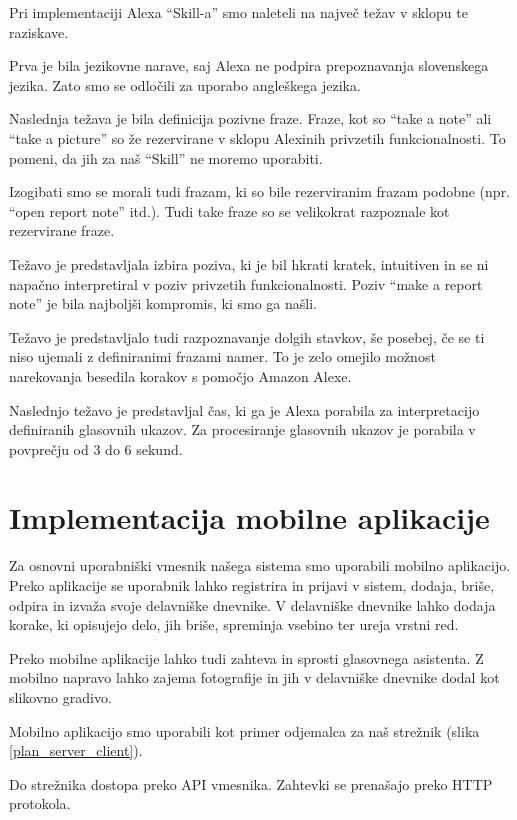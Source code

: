 \documentclass[a4paper, 12pt]{book}
\begin{document}
Pri implementaciji Alexa \enquote{Skill-a} smo naleteli na največ težav v sklopu te raziskave.

Prva je bila jezikovne narave, saj Alexa ne podpira prepoznavanja slovenskega jezika.
Zato smo se odločili za uporabo angleškega jezika.

Naslednja težava je bila definicija pozivne fraze.
Fraze, kot so \enquote{take a note} ali \enquote{take a picture} so že rezervirane v sklopu Alexinih privzetih funkcionalnosti.
To pomeni, da jih za naš \enquote{Skill} ne moremo uporabiti.

Izogibati smo se morali tudi frazam, ki so bile rezerviranim frazam podobne (npr. \enquote{open report note} itd.).
Tudi take fraze so se velikokrat razpoznale kot rezervirane fraze.

Težavo je predstavljala izbira poziva, ki je bil hkrati kratek, intuitiven in se ni napačno interpretiral v poziv privzetih funkcionalnosti.
Poziv \enquote{make a report note} je bila najboljši kompromis, ki smo ga našli.

Težavo je predstavljalo tudi razpoznavanje dolgih stavkov, še posebej, če se ti niso ujemali z definiranimi frazami namer.
To je zelo omejilo možnost narekovanja besedila korakov s pomočjo Amazon Alexe.

Naslednjo težavo je predstavljal čas, ki ga je Alexa porabila za interpretacijo definiranih glasovnih ukazov.
Za procesiranje glasovnih ukazov je porabila v povprečju od 3 do 6 sekund.

\section{Implementacija mobilne aplikacije}


Za osnovni uporabniški vmesnik našega sistema smo uporabili mobilno aplikacijo.
Preko aplikacije se uporabnik lahko registrira in prijavi v sistem, dodaja, briše, odpira in izvaža svoje delavniške dnevnike.
V delavniške dnevnike lahko dodaja korake, ki opisujejo delo, jih briše, spreminja vsebino ter ureja vrstni red.

Preko mobilne aplikacije lahko tudi zahteva in sprosti glasovnega asistenta.
Z mobilno napravo lahko zajema fotografije in jih v delavniške dnevnike dodal kot slikovno gradivo.

Mobilno aplikacijo smo uporabili kot primer odjemalca za naš strežnik (slika \ref{plan_server_client}).

Do strežnika dostopa preko API vmesnika.
Zahtevki se prenašajo preko HTTP protokola.
\end{document}

